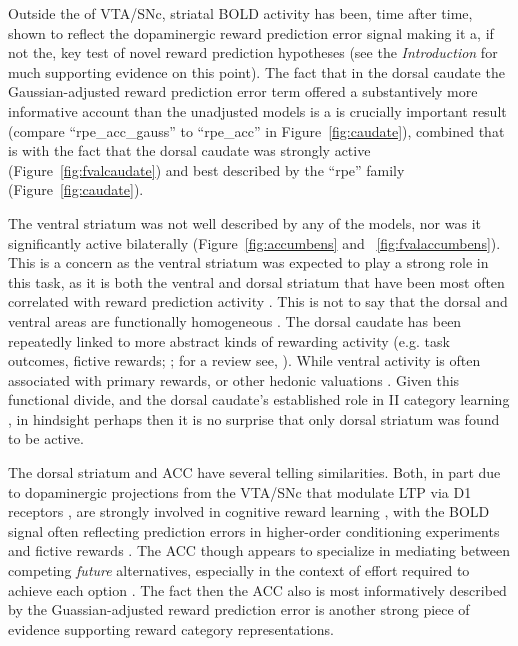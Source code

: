 \documentclass[doc,12pt]{apa}        %
\begin{document}
Outside the of VTA/SNc, striatal BOLD activity has been, time after time, shown to reflect the dopaminergic reward prediction error signal making it a, if not the, key test of novel reward prediction hypotheses (see the \emph{Introduction} for much supporting evidence on this point).  The fact that in the dorsal caudate the Gaussian-adjusted reward prediction error term offered a substantively more informative account than the unadjusted models is a is crucially important result (compare ``rpe\_acc\_gauss'' to ``rpe\_acc'' in Figure~\ref{fig:caudate}), combined that is with the fact that the dorsal caudate was strongly active (Figure~\ref{fig:fvalcaudate}) and best described by the ``rpe'' family (Figure~\ref{fig:caudate}).  
 
The ventral striatum was not well described by any of the models, nor was it significantly active bilaterally (Figure~\ref{fig:accumbens} and ~\ref{fig:fvalaccumbens}).  This is a concern as the ventral striatum was expected to play a strong role in this task, as it is both the ventral and dorsal striatum that have been most often correlated with reward prediction activity \cite{ODoherty:2003p6329,Knutson:2007p1687,Schonberg:2007p518}.  This is not to say that the dorsal and ventral areas are functionally homogeneous \cite{Schonberg:2009p6669,ODoherty:2004p1269,Atallah:2007p1746}.  The dorsal caudate has been repeatedly linked to more abstract kinds of rewarding activity (e.g. task outcomes, fictive rewards; ; for a review see, ).  While ventral activity is  often associated with primary rewards, or other hedonic valuations \cite{ODoherty:2004p1269}.  Given this functional divide, and the dorsal caudate's established role in II category learning \cite{Ashby:1998p9716}, in hindsight perhaps then it is no surprise that only dorsal striatum was found to be active.

The dorsal striatum and ACC have several telling similarities.  Both, in part due to dopaminergic projections from the VTA/SNc that modulate LTP via D1 receptors \cite{Schweimer:2006p9780}, are strongly involved in cognitive reward learning \cite{Atlas:2010p7566,Hayden:2009p6545,Rudebeck:2008p4712,Rolls:2008p7577,Quilodran:2008p2645,Hampton:2007p2983,Ernst:2004p3998}, with the BOLD signal often reflecting prediction errors in higher-order conditioning experiments \cite{seymour:2004aa} and fictive rewards \cite{Hayden:2009p6545}.  The ACC though appears to specialize in mediating between competing \emph{future} alternatives, especially in the context of effort required to achieve each option \cite{Quilodran:2008p2645}.  The fact then the ACC also is most informatively described by the Guassian-adjusted reward prediction error is another strong piece of evidence supporting reward category representations.  
\end{document}
